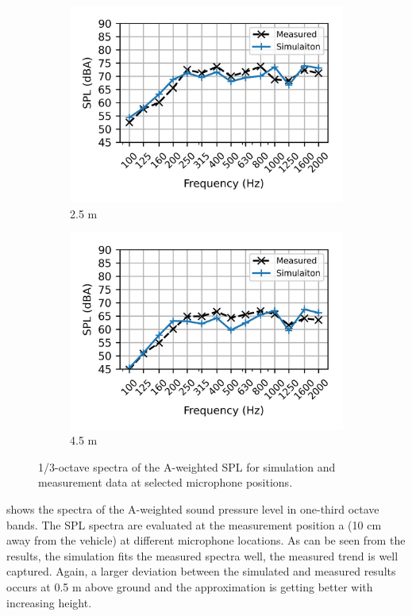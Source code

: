 \begin{figure}
\begin{subfigure}[b]{0.49\textwidth}
		\centering
		\includegraphics{fig/chap5/initial_model/freq_spectrum/pos_10cm_2pt5m.png}
		\caption{2.5 m}
	\end{subfigure}
	\hfill
	\begin{subfigure}[b]{0.49\textwidth}
		\centering
		\includegraphics{fig/chap5/initial_model/freq_spectrum/pos_10cm_4pt5m.png}
		\caption{4.5 m}
	\end{subfigure}
	\caption{1/3-octave spectra of the A-weighted SPL for simulation and measurement data at selected microphone positions.}
	\label{fig:freq_spectrum}
\end{figure}
%
 shows the spectra of the A-weighted sound pressure level in one-third octave bands. The SPL spectra are evaluated at the measurement position a (10 cm away from the vehicle) at different microphone locations. As can be seen from the results, the simulation fits the measured spectra well, the measured trend is well captured. Again, a larger deviation between the simulated and measured results occurs at 0.5 m above ground and the approximation is getting better with increasing height.

